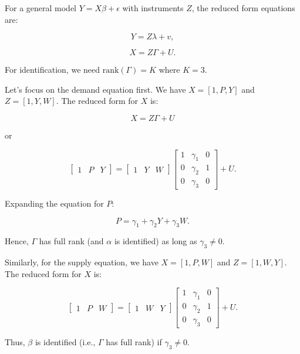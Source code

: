 \documentclass[12pt, oneside]{article}
\begin{document}
For a general model \( Y = X\beta + \epsilon \) with instruments \( Z \), the reduced form equations are:

\[
Y = Z\lambda + v,
\]

\[
X = Z\Gamma + U.
\]

For identification, we need \( \text{rank}(\Gamma) = K \) where \( K = 3 \).

Let's focus on the demand equation first. We have \( X = [1, P, Y] \) and \( Z = [1, Y, W] \). The reduced form for \( X \) is:

\[
X = Z\Gamma + U
\]

or

\[
\begin{bmatrix} 1 & P & Y \end{bmatrix} = \begin{bmatrix} 1 & Y & W \end{bmatrix}
\begin{bmatrix} 
1 & \gamma_1 & 0 \\ 
0 & \gamma_2 & 1 \\ 
0 & \gamma_3 & 0 
\end{bmatrix} + U.
\]

Expanding the equation for \( P \):

\[
P = \gamma_1 + \gamma_2 Y + \gamma_3 W.
\]

Hence, \( \Gamma \) has full rank (and \( \alpha \) is identified) as long as \( \gamma_3 \neq 0 \).

Similarly, for the supply equation, we have \( X = [1, P, W] \) and \( Z = [1, W, Y] \). The reduced form for \( X \) is:

\[
\begin{bmatrix} 1 & P & W \end{bmatrix} = \begin{bmatrix} 1 & W & Y \end{bmatrix}
\begin{bmatrix} 
1 & \gamma_1 & 0 \\ 
0 & \gamma_2 & 1 \\ 
0 & \gamma_3 & 0 
\end{bmatrix} + U.
\]

Thus, \( \beta \) is identified (i.e., \( \Gamma \) has full rank) if \( \gamma_3 \neq 0 \).
\end{document}
